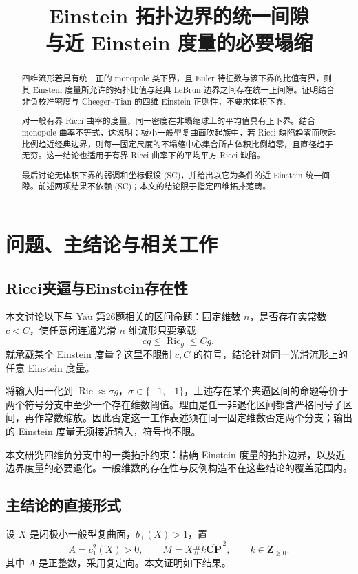 \documentclass[UTF8,fontset=fandol,zihao=-4]{ctexart}
\title{Einstein 拓扑边界的统一间隙\\[2mm]\large 与近 Einstein 度量的必要塌缩}
\author{}
\date{}
\theoremstyle{cn}
\DeclareMathOperator{\Ric}{Ric}
\numberwithin{equation}{section}
\begin{document}
\maketitle
\begin{abstract}
四维流形若具有统一正的 monopole 类下界，且 Euler 特征数与该下界的比值有界，则其 Einstein 度量所允许的拓扑比值与经典 LeBrun 边界之间存在统一正间隙。证明结合非负校准密度与 Cheeger--Tian 的四维 Einstein 正则性，不要求体积下界。

对一般有界 Ricci 曲率的度量，同一密度在非塌缩球上的平均值具有正下界。结合 monopole 曲率不等式，这说明：极小一般型复曲面吹起族中，若 Ricci 缺陷趋零而吹起比例趋近经典边界，则每一固定尺度的不塌缩中心集合所占体积比例趋零，且直径趋于无穷。这一结论也适用于有界 Ricci 曲率下的平均平方 Ricci 缺陷。

最后讨论无体积下界的弱调和坐标假设 (SC)，并给出以它为条件的近 Einstein 统一间隙。前述两项结果不依赖 (SC)；本文的结论限于指定四维拓扑范畴。
\end{abstract}
\tableofcontents

\section{问题、主结论与相关工作}

\subsection{Ricci夹逼与Einstein存在性}

本文讨论以下与 Yau 第26题相关的区间命题：固定维数 $n$，是否存在实常数 $c<C$，使任意闭连通光滑 $n$ 维流形只要承载
\[
cg\le\Ric_g\le Cg,
\]
就承载某个 Einstein 度量？这里不限制 $c,C$ 的符号，结论针对同一光滑流形上的任意 Einstein 度量。

将输入归一化到 $\Ric\approx\sigma g$，$\sigma\in\{+1,-1\}$，上述存在某个夹逼区间的命题等价于两个符号分支中至少一个存在维数阈值。理由是任一非退化区间都含严格同号子区间，再作常数缩放。因此否定这一工作表述须在同一固定维数否定两个分支；输出的 Einstein 度量无须接近输入，符号也不限。

本文研究四维负分支中的一类拓扑约束：精确 Einstein 度量的拓扑边界，以及近边界度量的必要退化。一般维数的存在性与反例构造不在这些结论的覆盖范围内。

\subsection{主结论的直接形式}

设 $X$ 是闭极小一般型复曲面，$b_+(X)>1$，置
\[
A=c_1^2(X)>0,\qquad M=X\#k\overline{\mathbf{CP}}^{\,2},\qquad k\in\mathbf Z_{\ge0}.
\]
其中 $A$ 是正整数，采用复定向。本文证明如下结果。
\end{document}
